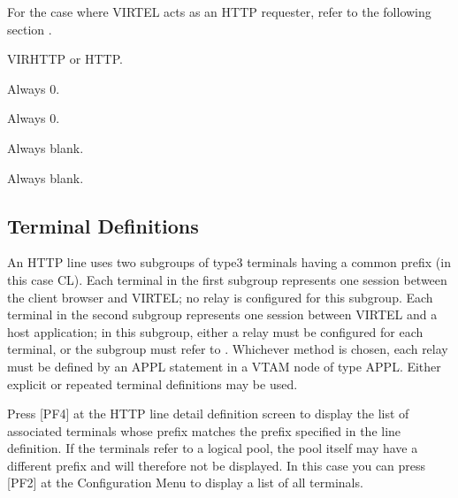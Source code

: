 \documentclass[letterpaper,10pt,english]{sphinxmanual}
\begin{document}
\begin{description}
\sphinxAtStartPar
For the case where VIRTEL acts as an HTTP requester, refer to the following section {\hyperref[\detokenize{connectivity_guide:v462cn-httpoutbound}]{}}.

\sphinxAtStartPar
VIRHTTP or HTTP.

\sphinxAtStartPar
Always 0.

\sphinxAtStartPar
Always 0.

\sphinxAtStartPar
Always blank.

\sphinxAtStartPar
Always blank.

\end{description}

\ignorespaces 

\subsection{Terminal Definitions}
\label{\detokenize{connectivity_guide:terminal-definitions}}\label{\detokenize{connectivity_guide:index-12}}
\sphinxAtStartPar
An HTTP line uses two sub\sphinxhyphen{}groups of type\sphinxhyphen{}3 terminals having a common prefix (in this case CL). Each terminal in the first sub\sphinxhyphen{}group represents one session between the client browser and VIRTEL; no relay is configured for this sub\sphinxhyphen{}group. Each terminal in the second sub\sphinxhyphen{}group represents one session between VIRTEL and a host application; in this sub\sphinxhyphen{}group, either a relay must be configured for each terminal, or the sub\sphinxhyphen{}group must refer to {\hyperref[\detokenize{connectivity_guide:v462cn-logicalpool}]{}}. Whichever method is chosen, each relay must be defined by an APPL statement in a VTAM node of type APPL. Either explicit or repeated terminal definitions may be used.

\sphinxAtStartPar
Press {[}PF4{]} at the HTTP line detail definition screen to display the list of associated terminals whose prefix matches the prefix specified in the line definition. If the terminals refer to a logical pool, the pool itself may have a different prefix and will therefore not be displayed. In this case you can press {[}PF2{]} at the Configuration Menu to display a list of all terminals.
\end{document}
